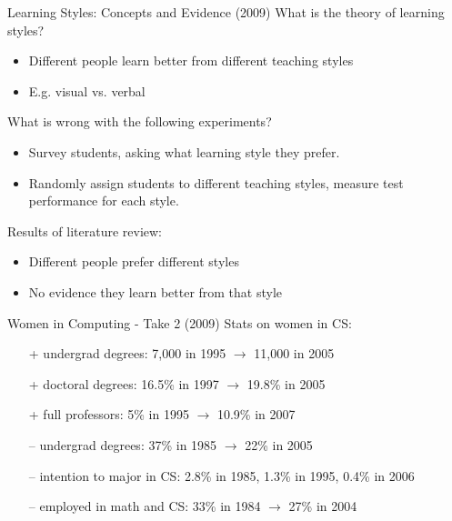 \documentclass{beamer}
\begin{document}
\begin{frame}{Learning Styles: Concepts and Evidence (2009)}
What is the theory of learning styles?
\pause
\begin{itemize}
\item Different people learn better from different teaching styles
\item E.g. visual vs. verbal
\end{itemize}
\pause
\bigskip
What is wrong with the following experiments?
\begin{itemize}
\item Survey students, asking what learning style they prefer.
\pause
\item Randomly assign students to different teaching styles, measure test performance for each style.
\end{itemize}
\pause
\bigskip
Results of literature review:
\begin{itemize}
\item Different people prefer different styles
\item No evidence they learn better from that style
\end{itemize}
\end{frame}

\begin{frame}{Women in Computing - Take 2 (2009)}
Stats on women in CS:
\begin{itemize}
\item[+] undergrad degrees: 7,000 in 1995 $\rightarrow$ 11,000 in 2005
\item[+] doctoral degrees: 16.5\% in 1997 $\rightarrow$ 19.8\% in 2005
\item[+] full professors: 5\% in 1995 $\rightarrow$ 10.9\% in 2007
\pause
\item[--] undergrad degrees: 37\% in 1985 $\rightarrow$ 22\% in 2005
\item[--] intention to major in CS: 2.8\% in 1985, 1.3\% in 1995, 0.4\% in 2006
\item[--] employed in math and CS: 33\% in 1984 $\rightarrow$ 27\% in 2004
\end{itemize}
\end{frame}
\end{document}
